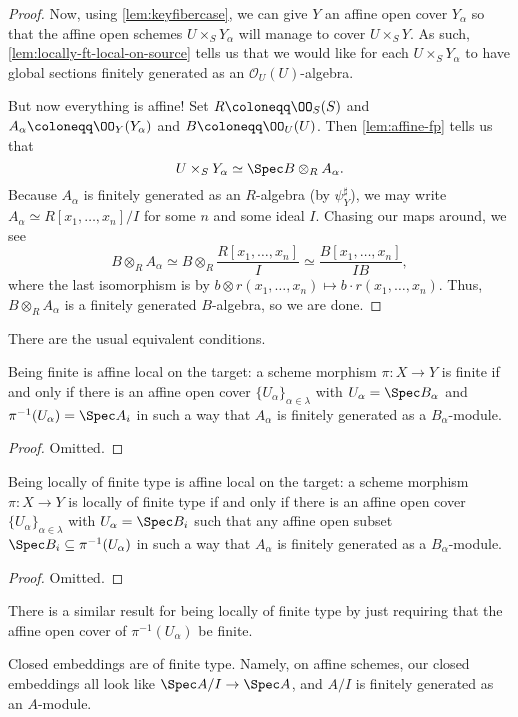 \documentclass[../notes.tex]{subfiles}
\begin{document}
\begin{proof}
	Now, using \autoref{lem:keyfibercase}, we can give $Y$ an affine open cover $Y_\alpha$ so that the affine open schemes $U\times_SY_\alpha$ will manage to cover $U\times_SY$. As such, \autoref{lem:locally-ft-local-on-source} tells us that we would like for each $U\times_SY_\alpha$ to have global sections finitely generated as an $\mathcal O_U(U)$-algebra.

	But now everything is affine! Set $R\coloneqq\OO_S(S)$ and $A_\alpha\coloneqq\OO_Y(Y_\alpha)$ and $B\coloneqq\OO_U(U)$. Then \autoref{lem:affine-fp} tells us that
	\[U\times_SY_\alpha\simeq\Spec B\otimes_RA_\alpha.\]
	Because $A_\alpha$ is finitely generated as an $R$-algebra (by $\psi_Y^\sharp$), we may write $A_\alpha\simeq R[x_1,\ldots,x_n]/I$ for some $n$ and some ideal $I$. Chasing our maps around, we see
	\[B\otimes_RA_\alpha\simeq B\otimes_R\frac{R[x_1,\ldots,x_n]}I\simeq\frac{B[x_1,\ldots,x_n]}{IB},\]
	where the last isomorphism is by $b\otimes r(x_1,\ldots,x_n)\mapsto b\cdot r(x_1,\ldots,x_n)$. Thus, $B\otimes_RA_\alpha$ is a finitely generated $B$-algebra, so we are done.
\end{proof}
There are the usual equivalent conditions.
\begin{lemma}
	Being finite is affine local on the target: a scheme morphism $\pi\colon X\to Y$ is finite if and only if there is an affine open cover $\{U_\alpha\}_{\alpha\in\lambda}$ with $U_\alpha=\Spec B_\alpha$ and $\pi^{-1}(U_\alpha)=\Spec A_i$ in such a way that $A_\alpha$ is finitely generated as a $B_\alpha$-module.
\end{lemma}
\begin{proof}
	Omitted.
\end{proof}
\begin{lemma}
	Being locally of finite type is affine local on the target: a scheme morphism $\pi\colon X\to Y$ is locally of finite type if and only if there is an affine open cover $\{U_\alpha\}_{\alpha\in\lambda}$ with $U_\alpha=\Spec B_i$ such that any affine open subset $\Spec B_i\subseteq\pi^{-1}(U_\alpha)$ in such a way that $A_\alpha$ is finitely generated as a $B_\alpha$-module.
\end{lemma}
\begin{proof}
	Omitted.
\end{proof}
There is a similar result for being locally of finite type by just requiring that the affine open cover of $\pi^{-1}(U_\alpha)$ be finite.
\begin{remark}
	Closed embeddings are of finite type. Namely, on affine schemes, our closed embeddings all look like $\Spec A/I\to\Spec A$, and $A/I$ is finitely generated as an $A$-module.
\end{remark}
\end{document}
